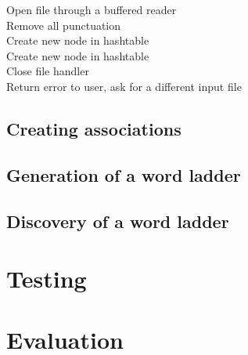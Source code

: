 \documentclass[10pt, a4paper]{article}
\begin{document}
\begin{algorithm}[H]
\SetAlgoLined
	 {
		Open file through a buffered reader \\
		 {
			Remove all punctuation \\
			 {
				Create new node in hashtable \\
			} {
				 {
					Create new node in hashtable\\
				}
			}
		}
		Close file handler\\
	} {
		Return error to user, ask for a different input file\\
	}

\end{algorithm}

\subsection{Creating associations}

\subsection{Generation of a word ladder}

\subsection{Discovery of a word ladder}

\section{Testing}

\section{Evaluation}
\end{document}

